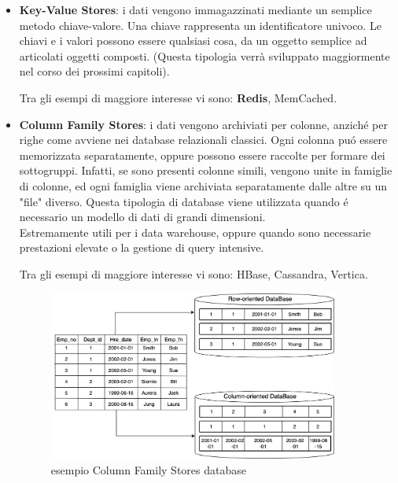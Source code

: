 \begin{itemize}
    \item \textbf{Key-Value Stores}: i dati vengono immagazzinati mediante un semplice metodo chiave-valore. Una chiave rappresenta un identificatore
    univoco. Le chiavi e i valori possono essere qualsiasi cosa, da un oggetto semplice ad articolati oggetti composti.
    (Questa tipologia verrà sviluppato maggiormente nel corso dei prossimi capitoli).

    Tra gli esempi di maggiore interesse vi sono: \textbf{Redis}, MemCached.
    \item \textbf{Column Family Stores}: i dati vengono archiviati per colonne, anziché per righe come avviene nei database relazionali classici.
    Ogni colonna puó essere memorizzata separatamente, oppure possono essere raccolte per formare dei sottogruppi.
    Infatti, se sono presenti colonne simili, vengono unite in famiglie di colonne, ed ogni famiglia
    viene archiviata separatamente dalle altre su un "file" diverso.
    Questa tipologia di database viene utilizzata quando é necessario un modello di dati di grandi dimensioni.\\
    Estremamente utili per i data warehouse, oppure quando sono necessarie prestazioni elevate o la gestione di query intensive.

    Tra gli esempi di maggiore interesse vi sono: HBase, Cassandra, Vertica.

    \begin{figure}[H]
        \begin{center}
            \includegraphics[width=0.9\textwidth]{img/dbColumnOriented}
        \end{center}
    \caption{esempio Column Family Stores database}
    \end{figure}


\end{itemize}

